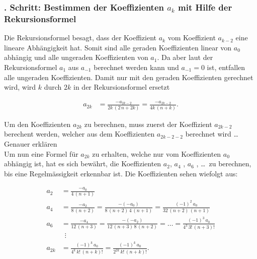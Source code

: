 \subsubsection{. Schritt: Bestimmen der Koeffizienten $a_k$ mit Hilfe der Rekursionsformel }
\begin{normalsize}%
Die Rekursionsformel  besagt,
dass der Koeffizient $a_k$ vom Koeffizient $a_{k-2}$ eine lineare Abh\"angigkeit hat.
Somit sind alle geraden Koeffizienten linear von $a_0$ abh\"angig und alle un\-geraden Koeffizienten von $a_1$.
Da aber laut der Rekursionsformel  $a_1$ aus $a_{-1}$ berechnet werden kann und $a_{-1} = 0$ ist,
entfallen alle ungeraden Koeffizienten.
Damit nur mit den geraden Koeffizienten gerechnet wird,
wird $k$ durch $2k$ in der Rekursionsformel  ersetzt
\end{normalsize}
\begin{align}
	\nonumber
	a_{2k}
	&=
	\frac
	{
		-a_{2k - 2}
	}{
		2k \, \left( 2 \, n + 2k \right)	
	}
	=
	\frac
	{
		-a_{2k - 2}
	}{
		4k \, \left( n + k \right)	
	}
	\text{.}
\end{align}
\begin{normalsize}%
Um den Koeffizienten $a_{2k}$ zu berechnen,
muss zuerst der Koeffizient $a_{2k-2}$ berechent werden,
welcher aus dem Koeffizienten $a_{2k-2-2}$ berechnet wird \dots Genauer erkl\"aren\\
Um nun eine Formel f\"ur $a_{2k}$ zu erhalten,
welche nur vom Koeffizienten $a_0$ abh\"angig ist,
hat es sich bew\"ahrt,
die Koeffizienten $a_2$, $a_4$ , $a_6$ , \dots \, zu berechnen,
bis eine Regelm\"assigkeit erkennbar ist.
Die Koeffizienten sehen wiefolgt aus:
\end{normalsize}
\begin{align}
	\nonumber
	a_2
	&=
	\frac
	{
		-a_0
	}{
		4 \, \left( n + 1 \right)	
	}
	\\
	\nonumber
	a_4
	&=
	\frac
	{
		-a_{2}
	}{
		8 \, \left( n + 2 \right)	
	}
	=
	\frac
	{
		- \left( - a_{0} \right)
	}{
		8 \, \left( n + 2 \right) \, 4 \, \left( n + 1 \right)
	}
	=
	\frac
	{
		\left( -1 \right) ^2 \, a_{0}
	}{
		32 \, \left( n + 2 \right) \, \left( n + 1 \right)
	}
	\\
	\nonumber
	a_6
	&=
	\frac
	{
		-a_{4}
	}{
		12 \, \left( n + 3 \right)	
	}
	=
	\frac
	{
		- \left( - a_{2} \right)
	}{
		12 \, \left( n + 3 \right) \, 8 \, \left( n + 2 \right)
	}
	=
	\dots
	=
	\frac
	{
		\left( -1 \right) ^3 \, a_{0}
	}{
		4^3 \, {3}! \, {\left( n + 3 \right)}!
	}
	\\
	\nonumber
	& \, \, \, \vdots
	\\
	a_{2k}
	&=	
	\frac
	{
		\left( -1 \right) ^k \, a_0 
	}{
		4^k \, {k}! \, {\left( n + k \right)}!
	}
	=
	\frac
	{
		\left( -1 \right) ^k \, a_0
	}{
		2^{2k} \, {k}! \, {\left( n + k \right)}!
	}
	\label{eq:bessel:koeffizienten:gerade}
	\text{.}
\end{align}
